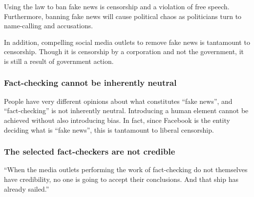 \par Using the law to ban fake news is censorship and a violation of free speech. Furthermore, banning fake news will cause political chaos as politicians turn to name-calling and accusations. \cite{eff_bill}
\par In addition, compelling social media outlets to remove fake news is tantamount to censorship. Though it is censorship by a corporation and not the government, it is still a result of government action. \cite{wp_germany}

\subsubsection{Fact-checking cannot be inherently neutral}

\par People have very different opinions about what constitute{}s ``fake news'', and ``fact-checking'' is not inherently neutral. Introducing a human element cannot be achieved without also introducing bias. \cite{vox_sentences} In fact, since Facebook is the entity deciding what is ``fake news'', this is tantamount to liberal censorship. \cite{milo_censor}

\subsubsection{The selected fact-checkers are not credible}

\par ``When the media outlets performing the work of fact-checking do not themselves have credibility, no one is going to accept their conclusions. And that ship has already sailed.'' \cite{vox_sentences}

%
\vfill